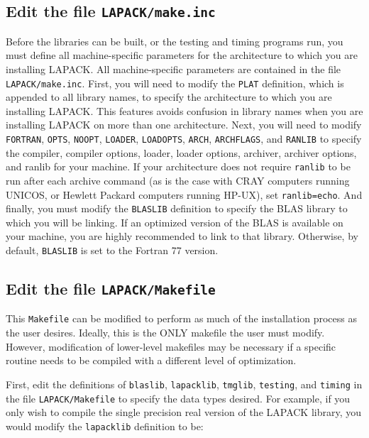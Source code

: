 \subsection{Edit the file {\tt LAPACK/make.inc}}

\dent
Before the libraries can be built, or the testing and timing programs
run, you must define all machine-specific parameters for the
architecture to which you are installing LAPACK.  All machine-specific
parameters are contained in the file {\tt LAPACK/make.inc}.  First, you will
need to modify the {\tt PLAT} definition, which is appended to all
library names, to specify the architecture to which you are installing
LAPACK.  This features avoids confusion in library names when you are 
installing LAPACK on more than one architecture.  Next, you will need
to modify {\tt FORTRAN}, {\tt OPTS}, {\tt NOOPT}, {\tt LOADER},
{\tt LOADOPTS}, {\tt ARCH}, {\tt ARCHFLAGS}, and {\tt RANLIB} to specify 
the compiler, compiler options, loader, loader options, archiver, 
archiver options, and ranlib for your machine.  If your architecture
does not require {\tt ranlib} to be run after each archive command (as
is the case with CRAY computers running UNICOS, or Hewlett Packard
computers running HP-UX), set {\tt ranlib=echo}.  And finally, you must
modify the {\tt BLASLIB} definition to specify the BLAS library to which
you will be linking.  If an optimized version of the BLAS is available
on your machine, you are highly recommended to link to that library.
Otherwise, by default, {\tt BLASLIB} is set to the Fortran 77 version.

\subsection{Edit the file {\tt LAPACK/Makefile}}\label{toplevelmakefile}

\dent
This {\tt Makefile} can be modified to perform as much of the
installation process as the user desires.  Ideally, this is the ONLY
makefile the user must modify.  However, modification of lower-level
makefiles may be necessary if a specific routine needs to be compiled
with a different level of optimization.  

First, edit the definitions of {\tt blaslib}, {\tt lapacklib},
{\tt tmglib}, {\tt testing}, and {\tt timing} in the file {\tt LAPACK/Makefile}
to specify the data types desired.  For example,
if you only wish to compile the single precision real version of the
LAPACK library, you would modify the {\tt lapacklib} definition to be:

